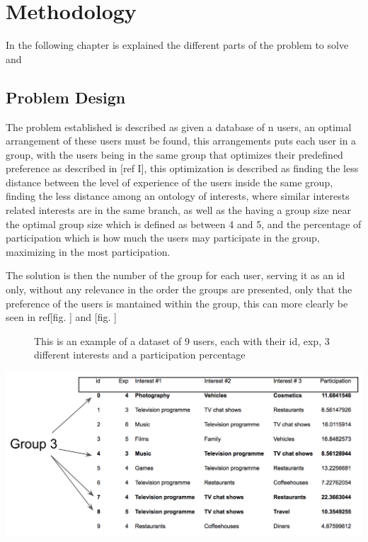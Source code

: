 \chapter{Methodology}
\label{chapter:chapter03}

In the following chapter is explained the different parts of the problem to solve and 




\section{Problem Design}

The problem established is described as given a database of n users, an optimal arrangement of these users must be found, this arrangements puts each user in a group, with the users being in the same group that optimizes their predefined preference as described in [ref I], this optimization is described as finding the less distance between the level of experience of the users inside the same group, finding the less distance among an ontology of interests, where similar interests related interests are in the same branch, as well as the having a group size near the optimal group size which is defined as between 4 and 5, and the percentage of participation which is how much the users may participate in the group, maximizing in the most participation.

The solution is then the number of the group for each user, serving it as an id only, without any relevance in the order the groups are presented, only that the preference of the users is mantained within the group, this can more clearly be seen in ref[fig. ] and [fig. ]

\begin{figure}[dataset]
    \caption{This is an example of a dataset of 9 users, each with their id, exp, 3 different interests and a participation percentage}
    
\end{figure}
\includegraphics{images/dataset_eg.png}


